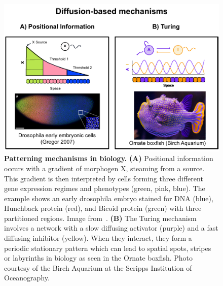 \begin{figure}[h!]
    \centering
    \includegraphics[width=1\textwidth]{chapters/Introduction/diffusion_based_mechanisms}
    \caption{\textbf{Patterning mechanisms in biology.} \textbf{(A)} Positional information occurs with a gradient of morphogen X, steaming from a source. This gradient is then interpreted by cells forming three different gene expression regimes and phenotypes (green, pink, blue).
    The example shows an early drosophila embryo stained for DNA (blue), Hunchback protein (red), and Bicoid protein (green) with three partitioned regions. Image from~\cite{gregor2007probing}. \textbf{(B)} The Turing mechanism involves a network with a slow diffusing activator (purple) and a fast diffusing inhibitor (yellow). When they interact, they form a periodic stationary pattern which can lead to spatial spots, stripes or labyrinths in biology as seen in the Ornate boxfish. Photo courtesy of the Birch Aquarium at the Scripps Institution of Oceanography. }
    \label{fig:diffusion_based_mechanisms}
\end{figure}



